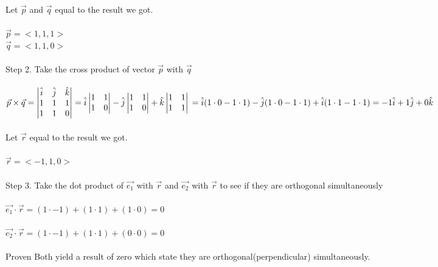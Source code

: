 \documentclass{article}
\begin{document}
\begin{enumerate}[4.]
Let $\vec{p}$ and $\vec{q}$ equal to the result we got.\\
\\
$\vec{p}=<1,1,1>$
\\
$\vec{q}=<1,1,0>$\\
\\
Step 2. Take the cross product of vector $\vec{p}$ with $\vec{q}$\\
\\
$\vec{p}\times\vec{q}=\begin{vmatrix}
\hat{i}&\hat{j}&\hat{k}\\
1&1&1\\
1&1&0\\
\end{vmatrix}=\hat{i}
\begin{vmatrix}
1&1\\
1&0\\
\end{vmatrix}-\hat{j}\begin{vmatrix}
1&1\\
1&0\\
\end{vmatrix}+\hat{k}\begin{vmatrix}
1&1\\
1&1\\
\end{vmatrix}\\=\hat{i}(1\cdot0-1\cdot1)-\hat{j}(1\cdot0-1\cdot1)+\hat{i}(1\cdot1-1\cdot1)=-1\hat{i}+1\hat{j}+0\hat{k}$\\
\\
Let $\vec{r}$ equal to the result we got.\\
\\
$\vec{r} = <-1,1,0>$\\
\\
Step 3. Take the dot product of $\vec{e_{1}}$ with $\vec{r}$  and $\vec{e_{2}}$ with $\vec{r}$ to see if they are orthogonal simultaneously\\
\\
$\vec{e_{1}}\cdot\vec{r}=(1\cdot-1)+(1\cdot1)+(1\cdot0)=0$
\\
\\
$\vec{e_{2}}\cdot\vec{r}=(1\cdot-1)+(1\cdot1)+(0\cdot0)=0$
\\
\\
Proven Both yield a result of zero which state they are orthogonal(perpendicular) simultaneously.
\end{enumerate}
\end{document}
